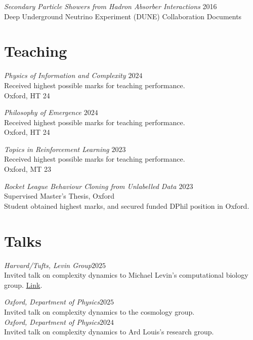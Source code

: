 \documentclass[margin]{res}
\begin{document}
\begin{resume}
                {\sl Secondary Particle Showers from Hadron Absorber Interactions} \hfill 2016 \\
                Deep Underground Neutrino Experiment (DUNE) Collaboration Documents


                \section{Teaching}
                        {\sl Physics of Information and Complexity \hfill $2024$}\\
                        Received highest possible marks for teaching performance.\\
                Oxford, HT 24

                {\sl Philosophy of Emergence \hfill $2024$}\\
                Received highest possible marks for teaching performance.\\
                Oxford, HT 24

                {\sl Topics in Reinforcement Learning \hfill $2023$}\\
                Received highest possible marks for teaching performance.\\
                Oxford, MT 23

                {\sl Rocket League Behaviour Cloning from Unlabelled Data \hfill $2023$}\\
                Supervised Master's Thesis, Oxford\\
                Student obtained highest marks, and secured funded DPhil position in Oxford.

                \section{Talks}
                {\sl Harvard/Tufts, Levin Group\hfill $2025$}\\
                Invited talk on complexity dynamics to Michael Levin's computational biology group. \href{https://www.youtube.com/watch?v=gb0z8lV1i78}{Link}.

                {\sl Oxford, Department of Physics\hfill $2025$}\\
                Invited talk on complexity dynamics to the cosmology group.\\

                {\sl Oxford, Department of Physics\hfill $2024$}\\
                Invited talk on complexity dynamics to Ard Louis's research group.


\end{resume}
\end{document}
